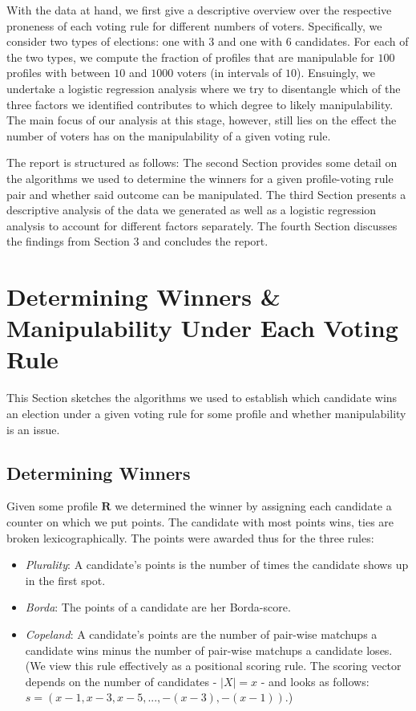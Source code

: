 \documentclass[10pt,a4paper]{article}
\begin{document}
With the data at hand, we first give a descriptive overview over the respective proneness of each voting rule for different numbers of voters. Specifically, we consider two types of elections: one with $3$ and one with $6$ candidates. For each of the two types, we compute the fraction of profiles that are manipulable for $100$ profiles with between $10$ and $1000$ voters (in intervals of $10$). Ensuingly, we undertake a logistic regression analysis where we try to disentangle which of the three factors we identified contributes to which degree to likely manipulability. The main focus of our analysis at this stage, however, still lies on the effect the number of voters has on the manipulability of a given voting rule.

The report is structured as follows: The second Section provides some detail on the algorithms we used to determine the winners for a given profile-voting rule pair and whether said outcome can be manipulated. The third Section presents a descriptive analysis of the data we generated as well as a logistic regression analysis to account for different factors separately. The fourth Section discusses the findings from Section 3 and concludes the report.
\section{Determining Winners \& Manipulability Under Each Voting Rule}
This Section sketches the algorithms we used to establish which candidate wins an election under a given voting rule for some profile and whether manipulability is an issue.
\subsection{Determining Winners}
Given some profile $\mathbf{R}$ we determined the winner by assigning each candidate a counter on which we put points. The candidate with most points wins, ties are broken lexicographically. The points were awarded thus for the three rules:
\begin{itemize}
\item \textit{Plurality}: A candidate's points is the number of times the candidate shows up in the first spot.
\item \textit{Borda}: The points of a candidate are her Borda-score.
\item \textit{Copeland}: A candidate's points are the number of pair-wise matchups a candidate wins minus the number of pair-wise matchups a candidate loses. (We view this rule effectively as a positional scoring rule. The scoring vector depends on the number of candidates - $|X|=x$ - and looks as follows: $s=(x-1, x-3, x-5, ..., -(x-3), -(x-1))$.)
\end{itemize}
\end{document}
